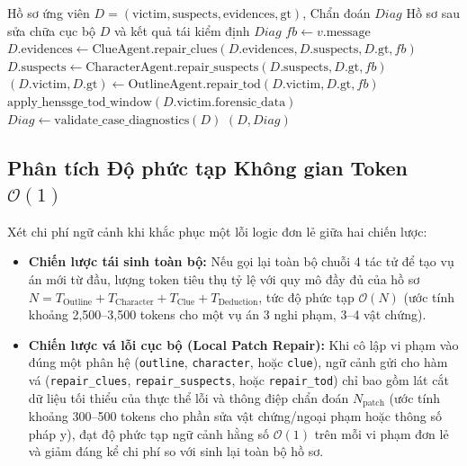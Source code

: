 \begin{algorithm}[H]
\caption{Cơ chế Vá Lỗi Cục bộ Định tuyến theo Phân hệ Vi phạm}
\label{alg:patch_repair}
{\small
\begin{algorithmic}[1]
\Require Hồ sơ ứng viên $D = (\text{victim}, \text{suspects}, \text{evidences}, \text{gt})$, Chẩn đoán $Diag$
\Ensure Hồ sơ sau sửa chữa cục bộ $D$ và kết quả tái kiểm định $Diag$
        \State $fb \gets v.\text{message}$
            \State $D.\text{evidences} \gets \text{ClueAgent.repair\_clues}(D.\text{evidences}, D.\text{suspects}, D.\text{gt}, fb)$
            \State $D.\text{suspects} \gets \text{CharacterAgent.repair\_suspects}(D.\text{suspects}, D.\text{gt}, fb)$
            \State $(D.\text{victim}, D.\text{gt}) \gets \text{OutlineAgent.repair\_tod}(D.\text{victim}, D.\text{gt}, fb)$
            \State $\text{apply\_henssge\_tod\_window}(D.\text{victim}.\text{forensic\_data})$
        \EndIf
    \EndFor
    \State $Diag \gets \text{validate\_case\_diagnostics}(D)$ 
\EndIf
\State \Return $(D, Diag)$
\end{algorithmic}
}
\end{algorithm}

\subsection{Phân tích Độ phức tạp Không gian Token \texorpdfstring{$\mathcal{O}(1)$}{O(1)}}
Xét chi phí ngữ cảnh khi khắc phục một lỗi logic đơn lẻ giữa hai chiến lược:
\begin{itemize}[leftmargin=1.5cm]
    \item \textbf{Chiến lược tái sinh toàn bộ:} Nếu gọi lại toàn bộ chuỗi 4 tác tử để tạo vụ án mới từ đầu, lượng token tiêu thụ tỷ lệ với quy mô đầy đủ của hồ sơ $N = T_{\text{Outline}} + T_{\text{Character}} + T_{\text{Clue}} + T_{\text{Deduction}}$, tức độ phức tạp $\mathcal{O}(N)$ (ước tính khoảng 2,500--3,500 tokens cho một vụ án 3 nghi phạm, 3--4 vật chứng).
    \item \textbf{Chiến lược vá lỗi cục bộ (Local Patch Repair):} Khi cô lập vi phạm vào đúng một phân hệ (\texttt{outline}, \texttt{character}, hoặc \texttt{clue}), ngữ cảnh gửi cho hàm vá (\texttt{repair\_clues}, \texttt{repair\_suspects}, hoặc \texttt{repair\_tod}) chỉ bao gồm lát cắt dữ liệu tối thiểu của thực thể lỗi và thông điệp chẩn đoán $N_{\text{patch}}$ (ước tính khoảng 300--500 tokens cho phần sửa vật chứng/ngoại phạm hoặc thông số pháp y), đạt độ phức tạp ngữ cảnh hằng số $\mathcal{O}(1)$ trên mỗi vi phạm đơn lẻ và giảm đáng kể chi phí so với sinh lại toàn bộ hồ sơ.
\end{itemize}

